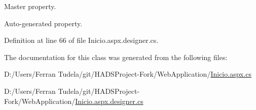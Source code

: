 Master property. 

Auto-\/generated property. 

Definition at line 66 of file Inicio.\+aspx.\+designer.\+cs.



The documentation for this class was generated from the following files\+:\begin{DoxyCompactItemize}
\item 
D\+:/\+Users/\+Ferran Tudela/git/\+H\+A\+D\+S\+Project-\/\+Fork/\+Web\+Application/\mbox{\hyperlink{Inicio_8aspx_8cs}{Inicio.\+aspx.\+cs}}\item 
D\+:/\+Users/\+Ferran Tudela/git/\+H\+A\+D\+S\+Project-\/\+Fork/\+Web\+Application/\mbox{\hyperlink{Inicio_8aspx_8designer_8cs}{Inicio.\+aspx.\+designer.\+cs}}\end{DoxyCompactItemize}

